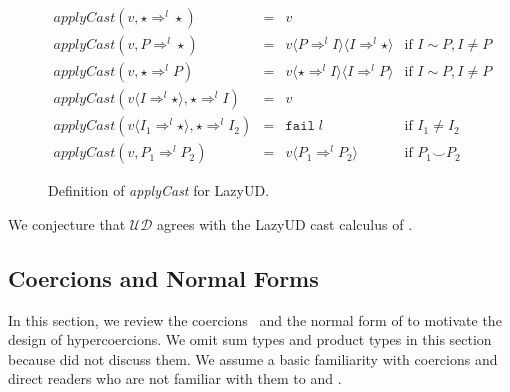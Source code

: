 \documentclass[acmsmall,review,anonymous]{acmart}\settopmatter{printfolios=true,printccs=false,printacmref=false}
\newcommand{\lazyUD}{Lazy\;UD}
\newcommand{\cOOcast}[3]{#1 \Rightarrow^{#2} #3}
\newcommand{\rOOfail}[1]{\mathtt{fail}\;#1}
\newcommand{\ineffCEKUD}{\ensuremath{\mathcal{UD}}}
\begin{document}
\begin{figure}
  \[
  \begin{array}{rclr}
    \mathit{applyCast}(v, \cOOcast{\star}{l}{\star} ) &=& v \\
    \mathit{applyCast}(v, \cOOcast{P}{l}{\star}) &=&
        v \langle \cOOcast{P}{l}{I} \rangle
          \langle \cOOcast{I}{l}{\star} \rangle
        & \text{if } I \sim P, I \neq P \\  
    \mathit{applyCast}(v, \cOOcast{\star}{l}{P}) &=&          
        v \langle \cOOcast{\star}{l}{I} \rangle
          \langle \cOOcast{I}{l}{P} \rangle
        & \text{if } I \sim P, I \neq P \\  
  \mathit{applyCast}(v \langle \cOOcast{I}{l}{\star} \rangle , \cOOcast{\star}{l}{I}) &=& v \\
  \mathit{applyCast}(v \langle \cOOcast{I_1}{l}{\star} \rangle , \cOOcast{\star}{l}{I_2}) &=& \rOOfail{l} & \text{if } I_1 \neq I_2 \\
  \mathit{applyCast}(v, \cOOcast{P_1}{l}{P_2}) &=&
     v \langle \cOOcast{P_1}{l}{P_2} \rangle & \text{if } P_1 \smile P_2
  \end{array}
  \]

  \caption{Definition of \textit{applyCast} for \lazyUD{}.}
  \label{fig:apply-Cast-UD}
\end{figure}

We conjecture that \ineffCEKUD{} agrees with the \lazyUD{} cast
calculus of \citet{siek2009exploring}.

\subsection{Coercions and Normal Forms} 
\label{sec:coercion-calculus}

In this section, we review the
coercions~\citep{henglein1994dynamic,herman2010space} and the normal
form of \citet{siek2012interpretations} to motivate the design of
hypercoercions.  We omit sum types and product types in this section
because \citet{siek2012interpretations} did not discuss them. We
assume a basic familiarity with coercions and direct readers who are
not familiar with them to \citet{siek2012interpretations} and
\citet{siek2015blame}.
\end{document}
